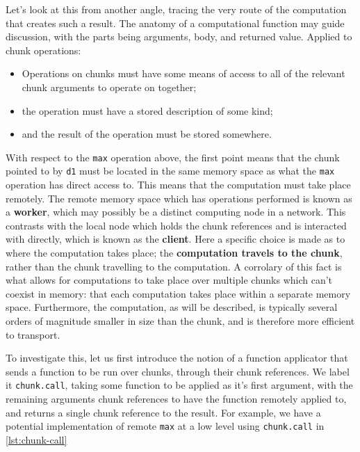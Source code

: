 Let's look at this from another angle, tracing the very route of the
computation that creates such a result. The anatomy of a computational
function may guide discussion, with the parts being arguments, body, and
returned value. Applied to chunk operations:

\begin{itemize}

    \item
          Operations on chunks must have some means of access to all of the
          relevant chunk arguments to operate on together;
    \item
          the operation must have a stored description of some kind;
    \item
          and the result of the operation must be stored somewhere.
\end{itemize}

With respect to the \texttt{max} operation above, the first point means
that the chunk pointed to by \texttt{d1} must be located in the same
memory space as what the \texttt{max} operation has direct access to.
This means that the computation must take place remotely. The remote
memory space which has operations performed is known as a
\textbf{worker}, which may possibly be a distinct computing node in a
network. This contrasts with the local node which holds the chunk
references and is interacted with directly, which is known as the
\textbf{client}. Here a specific choice is made as to where the
computation takes place; the \textbf{computation travels to the chunk},
rather than the chunk travelling to the computation. A corrolary of this
fact is what allows for computations to take place over multiple chunks
which can't coexist in memory: that each computation takes place within
a separate memory space. Furthermore, the computation, as will be
described, is typically several orders of magnitude smaller in size than
the chunk, and is therefore more efficient to transport.

To investigate this, let us first introduce the notion of a function
applicator that sends a function to be run over chunks, through their
chunk references. We label it \texttt{chunk.call}, taking some function
to be applied as it's first argument, with the remaining arguments chunk
references to have the function remotely applied to, and returns a
single chunk reference to the result. For example, we have a potential
implementation of remote \texttt{max} at a low level using
\texttt{chunk.call} in \cref{lst:chunk-call}

